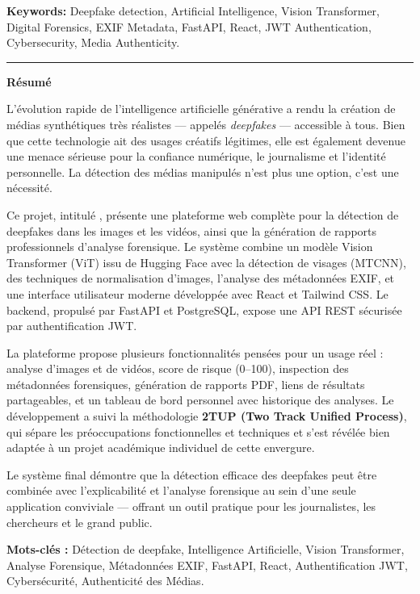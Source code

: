 \vspace{10pt}

\noindent\textbf{Keywords:} Deepfake detection, Artificial Intelligence, Vision Transformer, Digital Forensics, EXIF Metadata, FastAPI, React, JWT Authentication, Cybersecurity, Media Authenticity.

\newpage

\begin{center}
\rule{0.4\textwidth}{0.4pt}
\end{center}

\noindent\textbf{\large Résumé}

\vspace{8pt}

L'évolution rapide de l'intelligence artificielle générative a rendu la création de médias synthétiques très réalistes — appelés \textit{deepfakes} — accessible à tous. Bien que cette technologie ait des usages créatifs légitimes, elle est également devenue une menace sérieuse pour la confiance numérique, le journalisme et l'identité personnelle. La détection des médias manipulés n'est plus une option, c'est une nécessité.

\vspace{5pt}

Ce projet, intitulé \textbf{\projectname}, présente une plateforme web complète pour la détection de deepfakes dans les images et les vidéos, ainsi que la génération de rapports professionnels d'analyse forensique. Le système combine un modèle Vision Transformer (ViT) issu de Hugging Face avec la détection de visages (MTCNN), des techniques de normalisation d'images, l'analyse des métadonnées EXIF, et une interface utilisateur moderne développée avec React et Tailwind CSS. Le backend, propulsé par FastAPI et PostgreSQL, expose une API REST sécurisée par authentification JWT.

\vspace{5pt}

La plateforme propose plusieurs fonctionnalités pensées pour un usage réel : analyse d'images et de vidéos, score de risque (0--100), inspection des métadonnées forensiques, génération de rapports PDF, liens de résultats partageables, et un tableau de bord personnel avec historique des analyses. Le développement a suivi la méthodologie \textbf{2TUP (Two Track Unified Process)}, qui sépare les préoccupations fonctionnelles et techniques et s'est révélée bien adaptée à un projet académique individuel de cette envergure.

\vspace{5pt}

Le système final démontre que la détection efficace des deepfakes peut être combinée avec l'explicabilité et l'analyse forensique au sein d'une seule application conviviale — offrant un outil pratique pour les journalistes, les chercheurs et le grand public.

\vspace{10pt}

\noindent\textbf{Mots-clés :} Détection de deepfake, Intelligence Artificielle, Vision Transformer, Analyse Forensique, Métadonnées EXIF, FastAPI, React, Authentification JWT, Cybersécurité, Authenticité des Médias.